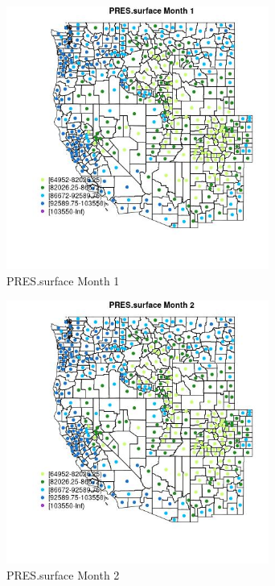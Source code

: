 \begin{figure} 
\centering  
\includegraphics[width=0.77\textwidth]{Code_Outputs/df_report_ML_predictors_CountyCentroid_Locations_Dates_2008-01-01to2018-12-31_MapObsMo1PRESsurface.jpg} 
\caption{\label{fig:df_report_ML_predictors_CountyCentroid_Locations_Dates_2008-01-01to2018-12-31MapObsMo1PRESsurface}PRES.surface Month 1} 
\end{figure} 
 

\begin{figure} 
\centering  
\includegraphics[width=0.77\textwidth]{Code_Outputs/df_report_ML_predictors_CountyCentroid_Locations_Dates_2008-01-01to2018-12-31_MapObsMo2PRESsurface.jpg} 
\caption{\label{fig:df_report_ML_predictors_CountyCentroid_Locations_Dates_2008-01-01to2018-12-31MapObsMo2PRESsurface}PRES.surface Month 2} 
\end{figure} 
 

